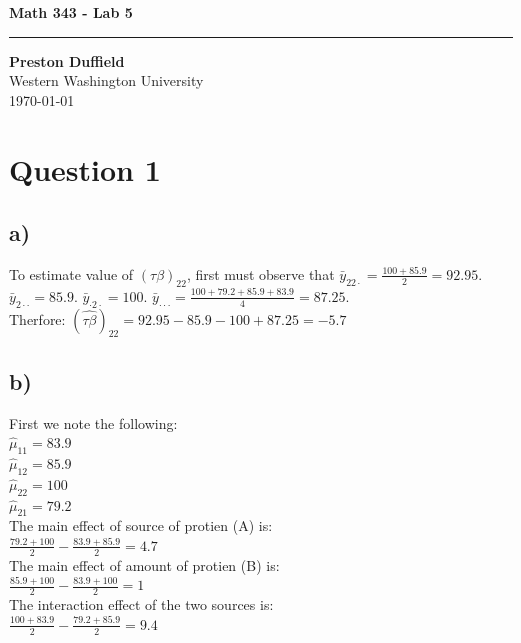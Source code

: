 \documentclass{article}
\begin{document}
\noindent
\begin{minipage}[t]{0.6\textwidth}
    \begin{flushleft}
        \LARGE\textbf{Math 343 - Lab 5} \\
        \vspace{6pt} %
        \hrule width 10cm
        \vspace{12pt}
        \large\textbf{Preston Duffield} \\
        \large Western Washington University \\
        \today
        \vspace{24pt}
    \end{flushleft}
\end{minipage}

\section*{Question 1}
\subsection*{a)}
To estimate value of $(\tau \beta)_{22}$, first must observe that
$\bar{y}_{2 2 \cdot} = \frac{100 + 85.9}{2} = 92.95$.
$\bar{y}_{2 \cdot \cdot} = 85.9$.
$\bar{y}_{\cdot 2 \cdot} = 100$.
$\bar{y}_{\cdot \cdot \cdot} = \frac{100 + 79.2 + 85.9 + 83.9}{4} = 87.25$. \\

Therfore: $(\hat{\tau \beta})_{22} = 92.95 - 85.9 - 100 + 87.25 = -5.7$
\subsection*{b)}
First we note the following: \\
$\hat{\mu}_{11} = 83.9$ \\
$\hat{\mu}_{12} = 85.9$ \\
$\hat{\mu}_{22} = 100$ \\
$\hat{\mu}_{21} = 79.2$ \\
The main effect of source of protien (A) is: \\
$\frac{79.2 + 100}{2} - \frac{83.9 + 85.9}{2} = 4.7$ \\

The main effect of amount of protien (B) is: \\
$\frac{85.9 + 100}{2} - \frac{83.9 + 100}{2} = 1$ \\

The interaction effect of the two sources is: \\
$\frac{100 + 83.9}{2} - \frac{79.2 + 85.9}{2} = 9.4$ \\
\end{document}
